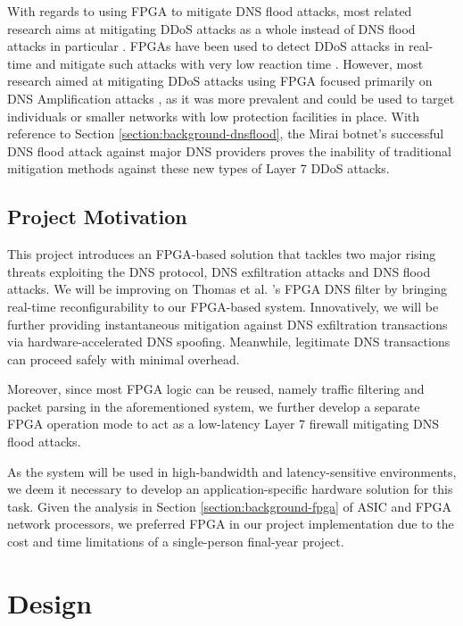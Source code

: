 \documentclass[a4paper]{report}
\begin{document}
With regards to using FPGA to mitigate DNS flood attacks, most related research aims at mitigating DDoS attacks as a whole instead of DNS flood attacks in particular \cite{hoque-2017, nagy-2018, tokusashi-2016, thinh-2016}. FPGAs have been used to detect DDoS attacks in real-time \cite{hoque-2017} and mitigate such attacks with very low reaction time \cite{nagy-2018}. However, most research aimed at mitigating DDoS attacks using FPGA focused primarily on DNS Amplification attacks \cite{nagy-2018, thinh-2016, tokusashi-2016}, as it was more prevalent and could be used to target individuals or smaller networks with low protection facilities in place. With reference to Section \ref{section:background-dnsflood}, the Mirai botnet's successful DNS flood attack against major DNS providers proves the inability of traditional mitigation methods against these new types of Layer 7 DDoS attacks. 

\section{Project Motivation}

This project introduces an FPGA-based solution that tackles two major rising threats exploiting the DNS protocol, DNS exfiltration attacks and DNS flood attacks. We will be improving on Thomas et al. \cite{thomas-2011}'s FPGA DNS filter by bringing real-time reconfigurability to our FPGA-based system. Innovatively, we will be further providing instantaneous	mitigation against DNS exfiltration transactions via hardware-accelerated DNS spoofing. Meanwhile, legitimate DNS transactions can proceed safely with minimal overhead.

Moreover, since most FPGA logic can be reused, namely traffic filtering and packet parsing in the aforementioned system, we further develop a separate FPGA operation mode to act as a low-latency Layer 7 firewall mitigating DNS flood attacks.

As the system will be used in high-bandwidth and latency-sensitive environments, we deem it necessary to develop an application-specific hardware solution for this task. Given the analysis in Section \ref{section:background-fpga} of ASIC and FPGA network processors, we preferred FPGA in our project implementation due to the cost and time limitations of a single-person final-year project.


\chapter{Design}
\end{document}
